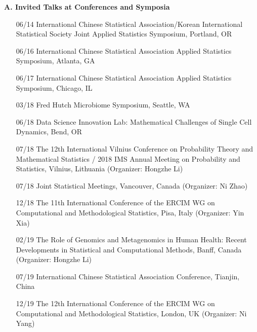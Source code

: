 \documentclass[10pt]{article}
\begin{document}
\textbf{A. Invited Talks at Conferences and Symposia}
\begin{enumerate}  
\item[06/14] International Chinese Statistical Association/Korean International Statistical Society Joint Applied Statistics Symposium, Portland, OR 
\item[06/16] International Chinese Statistical Association Applied Statistics Symposium, Atlanta, GA 
\item[06/17] International Chinese Statistical Association Applied Statistics Symposium, Chicago, IL
\item[03/18] Fred Hutch Microbiome Symposium, Seattle, WA 
\item[06/18] Data Science Innovation Lab: Mathematical Challenges of Single Cell Dynamics, Bend, OR
\item[07/18] The 12th International Vilnius Conference on Probability Theory and Mathematical Statistics / 2018 IMS Annual Meeting on Probability and Statistics, Vilnius, Lithuania (Organizer: Hongzhe Li)
\item[07/18] Joint Statistical Meetings, Vancouver, Canada (Organizer: Ni Zhao)
\item[12/18] The 11th International Conference of the ERCIM WG on Computational and Methodological Statistics, Pisa, Italy (Organizer: Yin Xia)
\item[02/19] The Role of Genomics and Metagenomics in Human Health: Recent Developments in Statistical and Computational Methods, Banff, Canada (Organizer: Hongzhe Li)
\item[07/19] International Chinese Statistical Association Conference, Tianjin, China
\item[12/19] The 12th International Conference of the ERCIM WG on Computational and Methodological Statistics, London, UK (Organizer: Ni Yang)

\end{enumerate}
\end{document}
